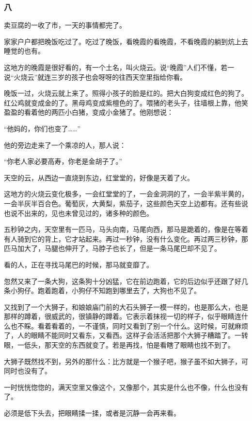 \subsubsection*{八}
\par 卖豆腐的一收了市，一天的事情都完了。
\par 家家户户都把晚饭吃过了。吃过了晚饭，看晚霞的看晚霞，不看晚霞的躺到炕上去睡觉的也有。
\par 这地方的晚霞是很好看的，有一个土名，叫火烧云。说“晚霞”人们不懂，若一说“火烧云”就连三岁的孩子也会呀呀的往西天空里指给你看。
\par 晚饭一过，火烧云就上来了。照得小孩子的脸是红的。把大白狗变成红色的狗了。红公鸡就变成金的了。黑母鸡变成紫檀色的了。喂猪的老头子，往墙根上靠，他笑盈盈的看着他的两匹小白猪，变成小金猪了。他刚想说：
\par “他妈的，你们也变了……”
\par 他的旁边走来了一个乘凉的人，那人说：
\par “你老人家必要高寿，你老是金胡子了。”
\par 天空的云，从西边一直烧到东边，红堂堂的，好像是天着了火。
\par 这地方的火烧云变化极多，一会红堂堂的了，一会金洞洞的了，一会半紫半黄的，一会半灰半百合色。葡萄灰，大黄梨，紫茄子，这些颜色天空上边都有。还有些说也说不出来的，见也未曾见过的，诸多种的颜色。
\par 五秒钟之内，天空里有一匹马，马头向南，马尾向西，那马是跪着的，像是在等着有人骑到它的背上，它才站起来。再过一秒钟，没有什么变化。再过两三秒钟，那匹马加大了，马腿也伸开了，马脖子也长了，但是一条马尾巴却不见了。
\par 看的人，正在寻找马尾巴的时候，那马就变靡了。
\par 忽然又来了一条大狗，这条狗十分凶猛，它在前边跑着，它的后边似乎还跟了好几条小狗仔。跑着跑着，小狗仔不知跑到哪里去了，大狗也不见了。
\par 又找到了一个大狮子，和娘娘庙门前的大石头狮子一模一样的，也是那么大，也是那样的蹲着，很威武的，很镇静的蹲着。它表示着抹视一切的样子，似乎眼睛连什么也不睬。看着看着的，一不谨慎，同时又看到了别一个什么。这时候，可就麻烦了，人的眼睛不能同时又看东，又看西。这样子会活活把那个大狮子糟踏了。一转眼，一低头，那天空的东西就变了。若是再找，怕是看瞎了眼睛也找不到了。
\par 大狮子既然找不到，另外的那什么：比方就是一个猴子吧，猴子虽不如大狮子，可同时也没有了。
\par 一时恍恍惚惚的，满天空里又像这个，又像那个，其实是什么也不像，什么也没有了。
\par 必须是低下头去，把眼睛揉一揉，或者是沉静一会再来看。
